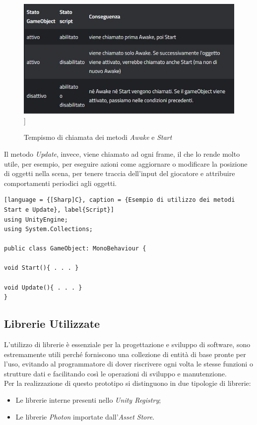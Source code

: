 \begin{figure}[H]
    \centering
    \includegraphics[scale = 0.6]{Immagini/Awake.jpg}]
    \caption{Tempismo di chiamata dei metodi \textit{Awake} e \textit{Start}}
    \label{fig:my_label}
\end{figure} 
\hspace{-0.6cm}Il metodo \textit{Update}, invece, viene chiamato ad ogni frame, il che lo rende molto utile, per esempio, per eseguire azioni come aggiornare o modificare la posizione di oggetti nella scena, per tenere traccia dell'input del giocatore e attribuire comportamenti periodici agli oggetti.
\begin{lstlisting}[language = {[Sharp]C}, caption = {Esempio di utilizzo dei metodi Start e Update}, label{Script}]
using UnityEngine;
using System.Collections;

public class GameObject: MonoBehaviour {

void Start(){ . . . }

void Update(){ . . . }
} 
\end{lstlisting}
\subsection{Librerie Utilizzate}
L'utilizzo di librerie è essenziale per la progettazione e sviluppo di software, sono estremamente utili perché forniscono una collezione di entità di base pronte per l'uso, evitando al programmatore di dover riscrivere ogni volta le stesse funzioni o strutture dati e facilitando così le operazioni di sviluppo e manutenzione.
\\Per la realizzazione di questo prototipo si distinguono in due tipologie di librerie:
\begin{itemize}
    \item Le librerie interne presenti nello \textit{\gls{Unity Registry}};
    \item Le librerie \textit{Photon} importate dall'\textit{\gls{Asset Store}}.
\end{itemize}
